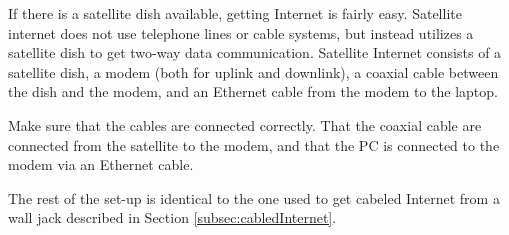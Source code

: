 If there is a satellite dish available, getting Internet is fairly easy. Satellite internet does not use telephone lines or cable systems, but instead utilizes a  satellite dish to get two-way data communication. Satellite Internet consists of a satellite dish, a modem (both for uplink and downlink), a coaxial cable between the dish and the modem, and an Ethernet cable from the modem to the laptop. 

Make sure that the cables are connected correctly. That the coaxial cable are connected from the satellite to the modem, and that the PC is connected to the modem via an Ethernet cable.

The rest of the set-up is identical to the one used to get cabeled Internet from a wall jack described in Section \ref{subsec:cabledInternet}. 


